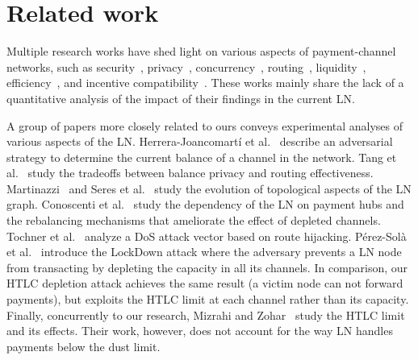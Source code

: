 \section{Related work}
\label{sec:related-work}


Multiple research works have shed light on various aspects of payment-channel networks, such as security~\cite{Malavolta2019, Kiayias2019}, privacy~\cite{Malavolta2017, HerreraJoancomarti2019}, concurrency~\cite{Malavolta2017}, routing~\cite{Malavolta2017a, Roos2018, Sivaraman2018, Prihodko2016}, liquidity~\cite{Dandekar2011,MorenoSanchez2018}, efficiency~\cite{Decker2018}, and incentive compatibility~\cite{Engelmann2017}.
These works mainly share the lack of a quantitative analysis of the impact of their findings in the current LN.

A group of papers more closely related to ours conveys experimental analyses of various aspects of the LN.
Herrera-Joancomart\'{i} et al.~\cite{HerreraJoancomarti2019} describe an adversarial 
strategy to determine the current balance of a channel in the network.
Tang et al.~\cite{Tang2019} study 
the tradeoffs between balance privacy and routing effectiveness. 
Martinazzi~\cite{Martinazzi2019} and Seres et al.~\cite{Seres2019} study the evolution of topological aspects of the LN graph.
Conoscenti et al.~\cite{Conoscenti2019} study the dependency of the LN on payment hubs 
and the rebalancing mechanisms that ameliorate the effect of depleted channels.
Tochner et al.~\cite{Tochner2019} analyze a DoS attack vector based on route hijacking. 
P{\'{e}}rez{-}Sol{\`{a}} et al.~\cite{PerezSola2019} introduce the LockDown attack where the adversary 
prevents a LN node from transacting by depleting the capacity in all its channels.
In comparison, our HTLC depletion attack achieves the same result (a victim node can not forward payments), but exploits the HTLC limit at each channel rather than its capacity.
Finally, concurrently to our research, Mizrahi and Zohar~\cite{Mizrahi2020} study the HTLC limit and its effects.
Their work, however, does not account for the way LN handles payments below the dust limit.


